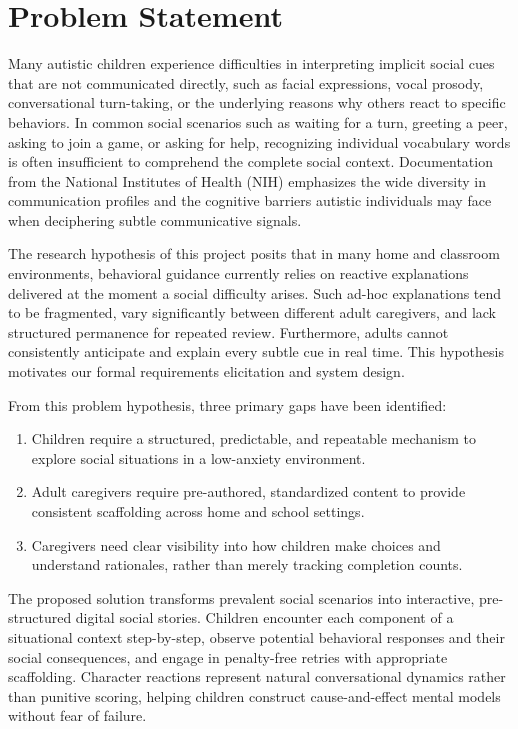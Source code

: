 \section{Problem Statement}

Many autistic children experience difficulties in interpreting implicit social cues that are not communicated directly, such as facial expressions, vocal prosody, conversational turn-taking, or the underlying reasons why others react to specific behaviors. In common social scenarios such as waiting for a turn, greeting a peer, asking to join a game, or asking for help, recognizing individual vocabulary words is often insufficient to comprehend the complete social context. Documentation from the National Institutes of Health (NIH) emphasizes the wide diversity in communication profiles and the cognitive barriers autistic individuals may face when deciphering subtle communicative signals.

The research hypothesis of this project posits that in many home and classroom environments, behavioral guidance currently relies on reactive explanations delivered at the moment a social difficulty arises. Such ad-hoc explanations tend to be fragmented, vary significantly between different adult caregivers, and lack structured permanence for repeated review. Furthermore, adults cannot consistently anticipate and explain every subtle cue in real time. This hypothesis motivates our formal requirements elicitation and system design.

From this problem hypothesis, three primary gaps have been identified:
\begin{enumerate}
    \item Children require a structured, predictable, and repeatable mechanism to explore social situations in a low-anxiety environment.
    \item Adult caregivers require pre-authored, standardized content to provide consistent scaffolding across home and school settings.
    \item Caregivers need clear visibility into how children make choices and understand rationales, rather than merely tracking completion counts.
\end{enumerate}

The proposed solution transforms prevalent social scenarios into interactive, pre-structured digital social stories. Children encounter each component of a situational context step-by-step, observe potential behavioral responses and their social consequences, and engage in penalty-free retries with appropriate scaffolding. Character reactions represent natural conversational dynamics rather than punitive scoring, helping children construct cause-and-effect mental models without fear of failure.


